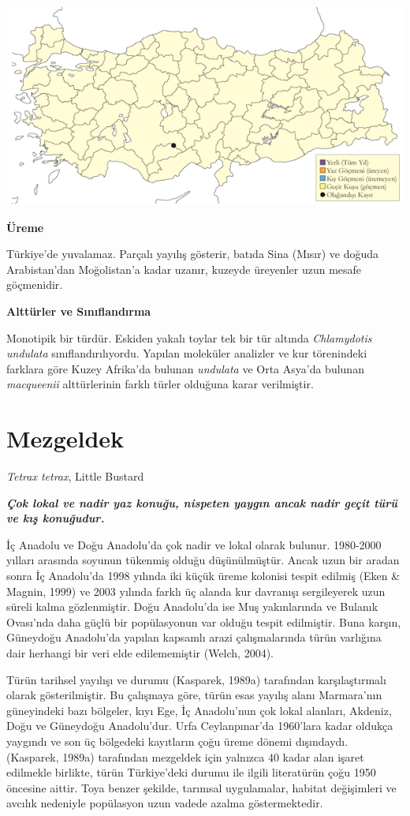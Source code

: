 \documentclass[
  a4paper,
  DIV=11,
  numbers=noendperiod]{scrreprt}
\begin{document}
\includegraphics{images/harita_Page_113.png}

\textbf{Üreme}

Türkiye'de yuvalamaz. Parçalı yayılış gösterir, batıda Sina (Mısır) ve
doğuda Arabistan'dan Moğolistan'a kadar uzanır, kuzeyde üreyenler uzun
mesafe göçmenidir.

\textbf{Alttürler ve Sınıflandırma}

Monotipik bir türdür. Eskiden yakalı toylar tek bir tür altında
\emph{Chlamydotis undulata} sınıflandırılıyordu. Yapılan moleküler
analizler ve kur törenindeki farklara göre Kuzey Afrika'da bulunan
\emph{undulata} ve Orta Asya'da bulunan \emph{macqueenii} alttürlerinin
farklı türler olduğuna karar verilmiştir.

\section{Mezgeldek}\label{mezgeldek}

\emph{Tetrax tetrax}, Little Bustard

\textbf{\emph{Çok lokal ve nadir yaz konuğu, nispeten yaygın ancak nadir
geçit türü ve kış konuğudur.}}

İç Anadolu ve Doğu Anadolu'da çok nadir ve lokal olarak bulunur.
1980-2000 yılları arasında soyunun tükenmiş olduğu düşünülmüştür. Ancak
uzun bir aradan sonra İç Anadolu'da 1998 yılında iki küçük üreme
kolonisi tespit edilmiş (Eken \& Magnin, 1999) ve 2003 yılında farklı üç
alanda kur davranışı sergileyerek uzun süreli kalma gözlenmiştir. Doğu
Anadolu'da ise Muş yakınlarında ve Bulanık Ovası'nda daha güçlü bir
popülasyonun var olduğu tespit edilmiştir. Buna karşın, Güneydoğu
Anadolu'da yapılan kapsamlı arazi çalışmalarında türün varlığına dair
herhangi bir veri elde edilememiştir (Welch, 2004).

Türün tarihsel yayılışı ve durumu (Kasparek, 1989a) tarafından
karşılaştırmalı olarak gösterilmiştir. Bu çalışmaya göre, türün esas
yayılış alanı Marmara'nın güneyindeki bazı bölgeler, kıyı Ege, İç
Anadolu'nun çok lokal alanları, Akdeniz, Doğu ve Güneydoğu Anadolu'dur.
Urfa Ceylanpınar'da 1960'lara kadar oldukça yaygındı ve son üç bölgedeki
kayıtların çoğu üreme dönemi dışındaydı. (Kasparek, 1989a) tarafından
mezgeldek için yalnızca 40 kadar alan işaret edilmekle birlikte, türün
Türkiye'deki durumu ile ilgili literatürün çoğu 1950 öncesine aittir.
Toya benzer şekilde, tarımsal uygulamalar, habitat değişimleri ve
avcılık nedeniyle popülasyon uzun vadede azalma göstermektedir.
\end{document}
